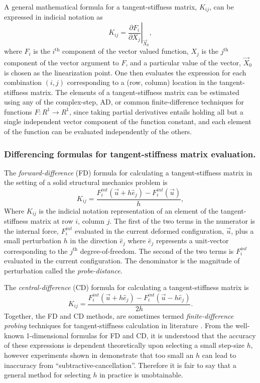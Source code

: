\documentclass[preprint,12pt]{elsarticle}
\begin{document}
A general mathematical formula for a tangent-stiffness matrix, $K_{ij}$, can be expressed in indicial notation as 
%
\begin{equation} 
  K_{ij} = \left. \frac{\partial F_i}{\partial X_j}\right|_{\vec{X}_0},
\end{equation}
%
where $F_i$ is the $i^{\mbox{th}}$ component of the vector valued function, $X_j$ is the $j^{\mbox{th}}$ component of the vector argument to $F$, and a particular value of the vector, $\vec{X}_0$ is chosen as the linearization point. One then evaluates the expression for each combination $(i, j)$ corresponding to a (row, column) location in the tangent-stiffness matrix. The elements of a tangent-stiffness matrix can be estimated using any of the complex-step, AD, or common finite-difference techniques for functions $F:R^1 \rightarrow R^1$, since taking partial derivatives entails holding all but a single independent vector component of the function constant, and each element of the function can be evaluated independently of the others. \\ 

\subsubsection{Differencing formulas for tangent-stiffness matrix evaluation.}

The \emph{forward-difference} (FD) formula for calculating a tangent-stiffness matrix in the setting of a solid structural mechanics problem is 
%
\begin{equation} 
  K_{ij} = \frac{F_i^{int}(\vec{u} + h \hat{e}_j) - F_i^{int}(\vec{u})}{h},
\end{equation}
%
Where $K_{ij}$ is the indicial notation representation of an element of the tangent-stiffness matrix at row $i$, column $j$. The first of the two terms in the numerator is the internal force, $F_i^{int}$ evaluated in the current deformed configuration, $\vec{u}$,  plus a small perturbation $h$ in the direction $\hat{e}_j$ where $\hat{e}_j$ represents a unit-vector corresponding to the $j^{\mbox{th}}$ degree-of-freedom. The second of the two terms is $F_i^{int}$ evaluated in the current configuration. The denominator is the magnitude of perturbation called the \emph{probe-distance}.

The \emph{central-difference} (CD) formula for calculating a tangent-stiffness matrix is
%
\begin{equation} 
  K_{ij} = \frac{F_i^{int}(\vec{u} + h \hat{e}_j) - F_i^{int}(\vec{u} - h \hat{e}_j)}{2 h}.
\end{equation}
%
Together, the FD and CD methods, are sometimes termed \emph{finite-difference probing} techniques for tangent-stiffness calculation in literature \cite{ref-Adaggio}. From the well-known 1-dimensional formulas for FD and CD, it is understood that the accuracy of these expressions is dependent theoretically upon selecting a small step-size $h$, however experiments shown in \cite{squire1998using} demonstrate that too small an $h$ can lead to inaccuracy from ``subtractive-cancellation''. Therefore it is fair to say that a general method for selecting $h$ in practice is unobtainable.
\end{document}
